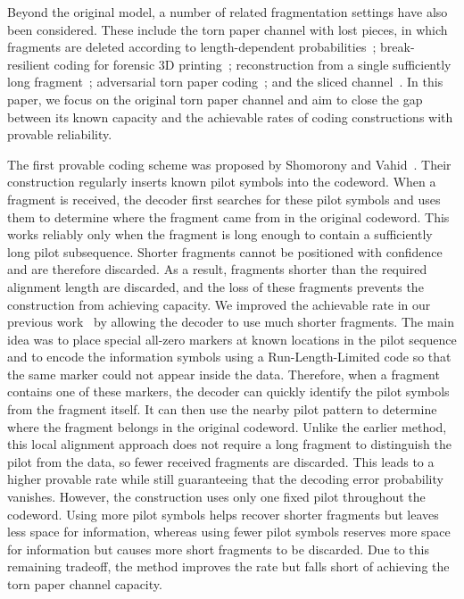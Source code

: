 \documentclass[journal,letterpaper,onecolumn,11pt]{IEEEtran}
\begin{document}
Beyond the original model, a number of related fragmentation settings have also been considered. These include the torn paper channel with lost pieces, in which fragments are deleted according to length-dependent probabilities~\cite{ravi2024recovering}; break-resilient coding for forensic 3D printing~\cite{wang2024breakresilientcodesforensic3d}; reconstruction from a single sufficiently long fragment~\cite{liu2025single}; adversarial torn paper coding~\cite{barlev}; and the sliced channel~\cite{sima2023error}. In this paper, we focus on the original  torn paper channel and aim to close the gap between its known capacity and the achievable rates of coding constructions with provable reliability.

The first provable coding scheme was proposed by Shomorony and Vahid~\cite{shomorony2021torn}. 
Their construction regularly inserts known pilot symbols into the codeword. 
When a fragment is received, the decoder first searches for these pilot symbols and uses them to determine where the fragment came from in the original codeword. 
This works reliably only when the fragment is long enough to contain a sufficiently long pilot subsequence. 
Shorter fragments cannot be positioned with confidence and are therefore discarded. 
As a result, fragments shorter than the required alignment length are discarded, and the loss of these fragments prevents the construction from achieving capacity.
We improved the achievable rate in our previous work~\cite{liu2026improved} by allowing the decoder to use much shorter fragments. 
The main idea was to place special all-zero markers at known locations in the pilot sequence and to encode the information symbols using a Run-Length-Limited code so that the same marker could not appear inside the data. 
Therefore, when a fragment contains one of these markers, the decoder can quickly identify the pilot symbols from the fragment itself. 
It can then use the nearby pilot pattern to determine where the fragment belongs in the original codeword. 
Unlike the earlier method, this local alignment approach does not require a long fragment to distinguish the pilot from the data, so fewer received fragments are discarded.
This leads to a higher provable rate while still guaranteeing that the decoding error probability vanishes. 
However, the construction uses only one fixed pilot throughout the codeword. 
Using more pilot symbols helps recover shorter fragments but leaves less space for information, whereas using fewer pilot symbols reserves more space for information but causes more short fragments to be discarded. 
Due to this remaining tradeoff, the method improves the rate but falls short of achieving the torn paper channel capacity.
\end{document}
